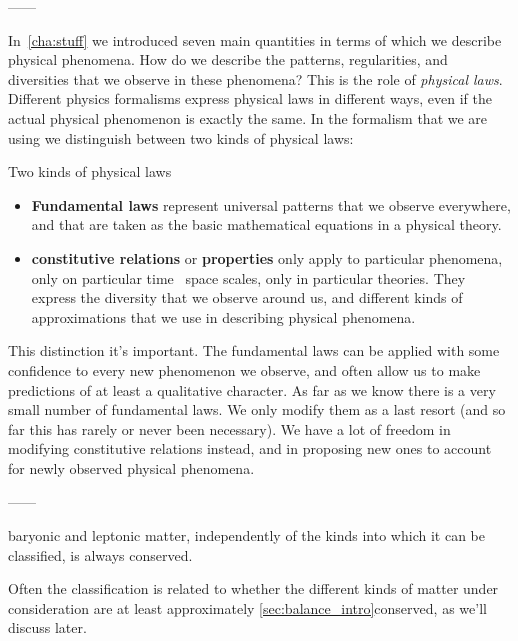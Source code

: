------


In \chap\,\ref{cha:stuff} we introduced seven main quantities in terms of which we describe physical phenomena. How do we describe the patterns, regularities, and diversities that we observe in these phenomena? This is the role of \emph{physical laws}. Different physics formalisms express physical laws in different ways, even if the actual physical phenomenon is exactly the same. In the formalism that we are using we distinguish between two kinds of physical laws:
\begin{definition}{Two kinds of physical laws}
  \begin{itemize}
  \item\textbf{Fundamental laws} represent universal patterns that we observe everywhere, and that are taken as the basic mathematical equations in a physical theory.

  \item\textbf{constitutive relations} or \textbf{properties} only apply to particular phenomena, only on particular time \amp\ space scales, only in particular theories. They express the diversity that we observe around us, and different kinds of approximations that we use in describing physical phenomena.
  \end{itemize}
\end{definition}

This distinction it's important. The fundamental laws can be applied with some confidence to every new phenomenon we observe, and often allow us to make predictions of at least a qualitative character. As far as we know there is a very small number of fundamental laws. We only modify them as a last resort (and so far this has rarely or never been necessary). We have a lot of freedom in modifying constitutive relations instead, and in proposing new ones to account for newly observed physical phenomena.

------

baryonic and leptonic matter, independently of the kinds into which it can be classified, is always conserved.


Often the classification is related to whether the different kinds of matter under consideration are at least approximately \autoref{sec:balance_intro}{conserved}, as we'll discuss later.

